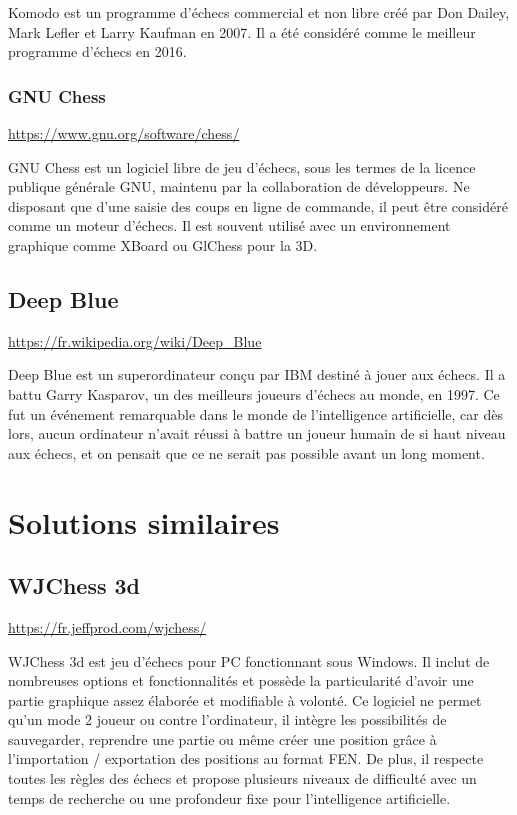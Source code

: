 \documentclass{article}
\begin{document}
Komodo est un programme d'échecs commercial et non libre créé par Don Dailey, Mark Lefler et Larry Kaufman en 2007. Il a été considéré comme le meilleur programme d'échecs en 2016.

\subsubsection{GNU Chess}
\url{https://www.gnu.org/software/chess/}
\newline

GNU Chess est un logiciel libre de jeu d'échecs, sous les termes de la licence publique générale GNU, maintenu par la collaboration de développeurs. Ne disposant que d'une saisie des coups en ligne de commande, il peut être considéré comme un moteur d'échecs. Il est souvent utilisé avec un environnement graphique comme XBoard ou GlChess pour la 3D.

\subsection{Deep Blue}
\url{https://fr.wikipedia.org/wiki/Deep_Blue}
\newline

Deep Blue est un superordinateur conçu par IBM destiné à jouer aux échecs. Il a battu Garry Kasparov, un des meilleurs joueurs d'échecs au monde, en 1997. Ce fut un événement remarquable dans le monde de l'intelligence artificielle, car dès lors, aucun ordinateur n'avait réussi à battre un joueur humain de si haut niveau aux échecs, et on pensait que ce ne serait pas possible avant un long moment.

\section{Solutions similaires}
\subsection{WJChess 3d}
\url{https://fr.jeffprod.com/wjchess/}
\newline

WJChess 3d est jeu d'échecs pour PC fonctionnant sous Windows. Il inclut de nombreuses options et fonctionnalités et possède la particularité d'avoir une partie graphique assez élaborée et modifiable à volonté.
Ce logiciel ne permet qu'un mode 2 joueur ou contre l'ordinateur, il intègre les possibilités de sauvegarder, reprendre une partie ou même créer une position grâce à l'importation / exportation des positions au format FEN.
De plus, il respecte toutes les règles des échecs et propose plusieurs niveaux de difficulté avec un temps de recherche ou une profondeur fixe pour l'intelligence artificielle.
\end{document}
